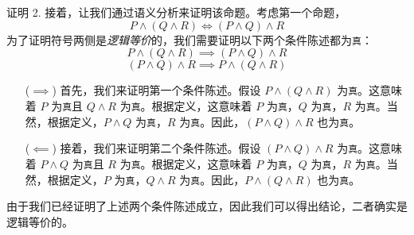 \begin{proofs}{证明 2. }
    接着，让我们通过语义分析来证明该命题。考虑第一个命题，
    \[P \land (Q \land R) \iff (P \land Q) \land R\]
    为了证明符号两侧是\emph{逻辑等价}的，我们需要证明以下两个条件陈述都为\verb|真|：
    \[P \land (Q \land R) \implies (P \land Q) \land R\]
    \[(P \land Q) \land R \implies P \land (Q \land R)\]
    \begin{itemize}
        \item[($\implies$)] 首先，我们来证明第一个条件陈述。假设 $P \land (Q \land R)$ 为\verb|真|。这意味着 $P$ 为\verb|真|且 $Q \land R$ 为\verb|真|。根据定义，这意味着 $P$ 为\verb|真|，$Q$ 为\verb|真|，$R$ 为\verb|真|。当然，根据定义，$P \land Q$ 为\verb|真|，$R$ 为\verb|真|。因此，$(P \land Q) \land R$ 也为\verb|真|。 
        \item[($\impliedby$)] 接着，我们来证明第二个条件陈述。假设 $(P \land Q) \land R$ 为\verb|真|。这意味着 $P \land Q$ 为\verb|真|且 $R$ 为\verb|真|。根据定义，这意味着 $P$ 为\verb|真|，$Q$ 为\verb|真|，$R$ 为\verb|真|。当然，根据定义，$P$ 为\verb|真|，$Q \land R$ 为\verb|真|。因此，$P \land (Q \land R)$ 也为\verb|真|。
    \end{itemize}
    由于我们已经证明了上述两个条件陈述成立，因此我们可以得出结论，二者确实是逻辑等价的。\\


\end{proofs}
